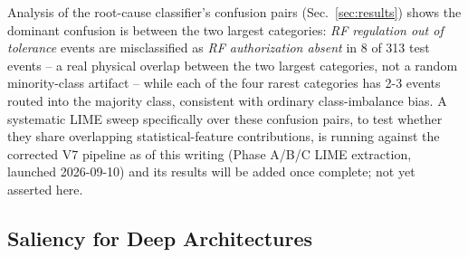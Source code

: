 Analysis of the root-cause classifier's confusion pairs (Sec.~\ref{sec:results}) shows the dominant confusion is between the two largest categories: \textit{RF regulation out of tolerance} events are misclassified as \textit{RF authorization absent} in 8 of 313 %
test events -- a real physical overlap between the two largest categories, not a random minority-class artifact -- while each of the four rarest categories has 2-3 events routed into the majority class, consistent with ordinary class-imbalance bias. %
A systematic LIME sweep specifically over these confusion pairs, to test whether they share overlapping statistical-feature contributions, is running against the corrected V7 pipeline as of this writing (Phase A/B/C LIME extraction, launched 2026-09-10) and its results will be added once complete; not yet asserted here.

\subsection{Saliency for Deep Architectures}


